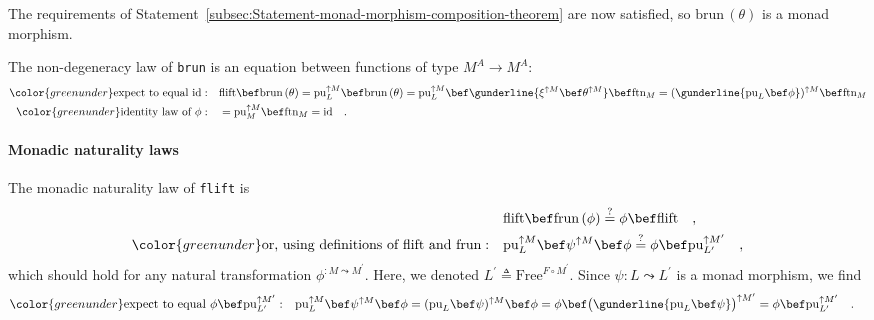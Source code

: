 The requirements of Statement~\ref{subsec:Statement-monad-morphism-composition-theorem}
are now satisfied, so $\text{brun}\,(\theta)$ is a monad morphism.

The non-degeneracy law of \lstinline!brun! is an equation between
functions of type $M^{A}\rightarrow M^{A}$:
\begin{align*}
{\color{greenunder}\text{expect to equal }\text{id}:}\quad & \text{flift}\bef\text{brun}\,(\theta)=\text{pu}_{L}^{\uparrow M}\bef\text{brun}\,(\theta)=\text{pu}_{L}^{\uparrow M}\bef\gunderline{\xi^{\uparrow M}\bef\theta^{\uparrow M}}\bef\text{ftn}_{M}=(\gunderline{\text{pu}_{L}\bef\phi})^{\uparrow M}\bef\text{ftn}_{M}\\
{\color{greenunder}\text{identity law of }\phi:}\quad & =\text{pu}_{M}^{\uparrow M}\bef\text{ftn}_{M}=\text{id}\quad.
\end{align*}


\paragraph{Monadic naturality laws}

The monadic naturality law of \lstinline!flift! is 
\begin{align*}
 & \text{flift}\bef\text{frun}\,(\phi)\overset{?}{=}\phi\bef\text{flift}\quad,\\
{\color{greenunder}\text{or, using definitions of }\text{flift}\text{ and }\text{frun}:}\quad & \text{pu}_{L}^{\uparrow M}\bef\psi^{\uparrow M}\bef\phi\overset{?}{=}\phi\bef\text{pu}_{L^{\prime}}^{\uparrow M^{\prime}}\quad,
\end{align*}
which should hold for any natural transformation $\phi^{:M\leadsto M^{\prime}}$.
Here, we denoted $L^{\prime}\triangleq\text{Free}^{F\circ M^{\prime}}$.
Since $\psi:L\leadsto L^{\prime}$ is a monad morphism, we find
\begin{align*}
{\color{greenunder}\text{expect to equal }\phi\bef\text{pu}_{L^{\prime}}^{\uparrow M^{\prime}}:}\quad & \text{pu}_{L}^{\uparrow M}\bef\psi^{\uparrow M}\bef\phi=(\text{pu}_{L}\bef\psi)^{\uparrow M}\bef\phi=\phi\bef\big(\gunderline{\text{pu}_{L}\bef\psi}\big)^{\uparrow M^{\prime}}=\phi\bef\text{pu}_{L^{\prime}}^{\uparrow M^{\prime}}\quad.
\end{align*}

